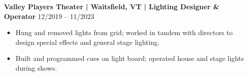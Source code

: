 \noindent
\textbf{Valley Players Theater | Waitsfield, VT | Lighting Designer \& Operator} \hfill 12/2019 -- 11/2023
\begin{itemize}
    \item Hung and removed lights from grid; worked in tandem with directors to design special effects and general stage lighting.
    \item Built and programmed cues on light board; operated house and stage lights during shows.
\end{itemize}
